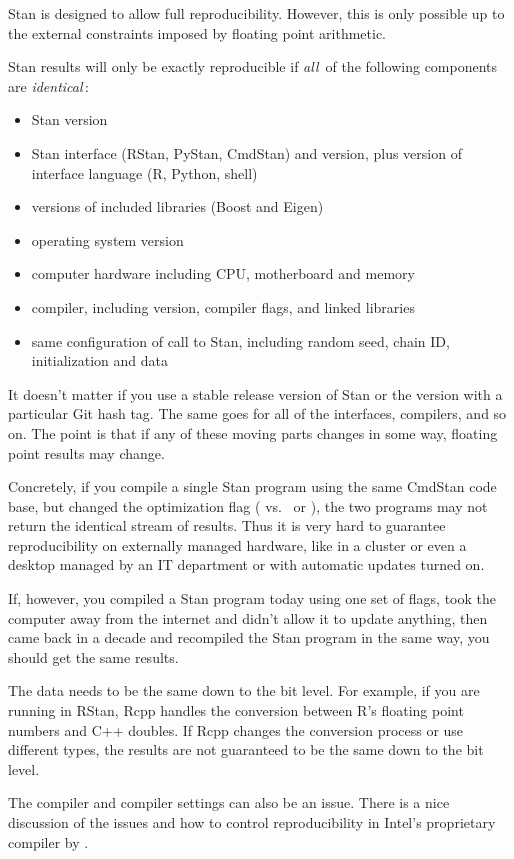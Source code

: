Stan is designed to allow full reproducibility.  However, this is only
possible up to the external constraints imposed by floating point
arithmetic.

Stan results will only be exactly reproducible if {\it all}\, of the following
components are {\it identical}\,:
%
\begin{itemize}
\item Stan version
\item Stan interface (RStan, PyStan, CmdStan) and version, plus version
  of interface language (R, Python, shell)
\item versions of included libraries (Boost and Eigen)
\item operating system version
\item computer hardware including CPU, motherboard and memory
\item \Cpp compiler, including version, compiler flags, and linked libraries
\item same configuration of call to Stan, including random seed, chain
  ID, initialization and data
\end{itemize}
%
It doesn't matter if you use a stable release version of Stan or the
version with a particular Git hash tag.  The same goes for all of the
interfaces, compilers, and so on.  The point is that if any of
these moving parts changes in some way, floating point results may
change.

Concretely, if you compile a single Stan program using the same
CmdStan code base, but changed the optimization flag ( vs.\
 or ), the two programs may not return the identical
stream of results.  Thus it is very hard to guarantee reproducibility
on externally managed hardware, like in a cluster or even a desktop
managed by an IT department or with automatic updates turned on.

If, however, you compiled a Stan program today using one set of flags,
took the computer away from the internet and didn't allow it to update
anything, then came back in a decade and recompiled the Stan program
in the same way, you should get the same results.

The data needs to be the same down to the bit level. For example, if
you are running in RStan, Rcpp handles the conversion between R's
floating point numbers and C++ doubles. If Rcpp changes the conversion
process or use different types, the results are not guaranteed to be
the same down to the bit level.  

The compiler and compiler settings can also be an issue.  There is a
nice discussion of the issues and how to control reproducibility in
Intel's proprietary compiler by \cite{CordenKreitzer:2014}.



